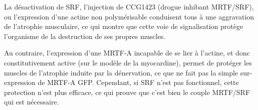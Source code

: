 La désactivation de SRF, l'injection de CCG1423 (drogue inhibant MRTF/SRF), ou l'expression d'une actine non polymérisable conduisent tous à une aggravation de l'atrophie musculaire, ce qui montre que cette voie de signalisation protège l'organisme de la destruction de ses propres muscles. 

Au contraire, l'expression d'une MRTF-A incapable de se lier à l'actine, et donc constitutivement active (sur le modèle de la myocardine), permet de protéger les muscles de l'atrophie induite par la dénervation, ce que ne fait pas la simple sur-expression de MRTF-A GFP. Cependant, si SRF n'est pas fonctionnel, cette protection n'est plus efficace, ce qui prouve que c'est bien le couple MRTF/SRF qui est nécessaire. 


%

